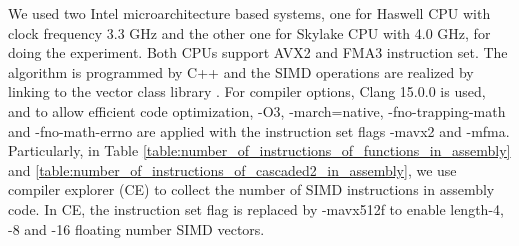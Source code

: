We used two Intel microarchitecture based systems, one for Haswell CPU with clock frequency 3.3 GHz and
the other one for Skylake CPU with 4.0 GHz, for doing the experiment. Both CPUs support AVX2 and FMA3
instruction set. The algorithm is programmed by C++ and the SIMD operations are realized
by linking to the vector class library \cite{Agner_04}. 
For compiler options, Clang 15.0.0 is used, and to allow efficient code optimization,
-O3, -march=native, -fno-trapping-math and -fno-math-errno are applied with the instruction set flags -mavx2 and -mfma.
Particularly, in Table \ref{table:number_of_instructions_of_functions_in_assembly} 
and \ref{table:number_of_instructions_of_cascaded2_in_assembly},
we use compiler explorer (CE) \cite{Matt_12} to 
collect the number of SIMD instructions in  
assembly code.
In CE, the instruction set flag is replaced by -mavx512f to enable
length-4, -8 and -16 floating number SIMD vectors.





